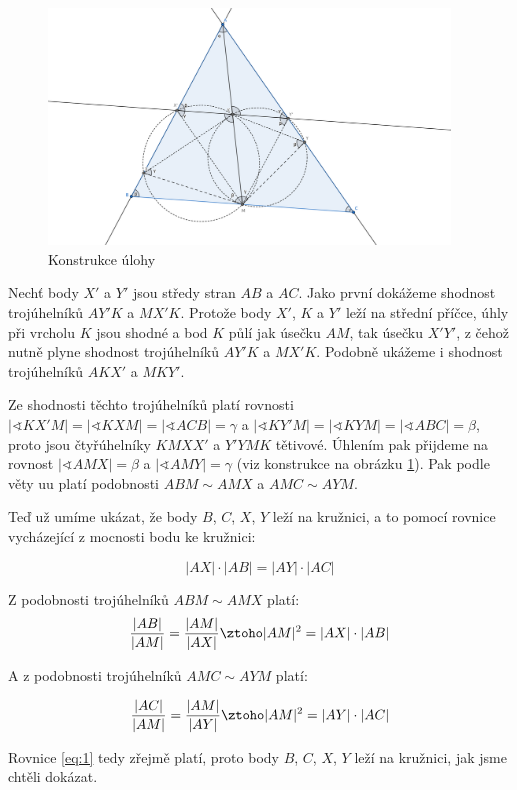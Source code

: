 \documentclass{fkssolpub}
\author{Ondřej Sedláček}
\renewcommand{\angle}{\sphericalangle}
\begin{document}
\begin{figure}
  \begin{center}
    \includegraphics[width=0.95\textwidth]{G-fig.png}
  \end{center}
  \caption{Konstrukce úlohy}
  \label{fig:1}
\end{figure}


Nechť body $X'$ a $Y'$ jsou středy stran $AB$ a $AC$. Jako první dokážeme shodnost trojúhelníků $AY'K$ a $MX'K$. Protože body $X'$, $K$ a $Y'$ leží na střední příčce, úhly při vrcholu $K$ jsou shodné a bod $K$ půlí jak úsečku $AM$, tak úsečku $X'Y'$, z čehož nutně plyne shodnost trojúhelníků $AY'K$ a $MX'K$. Podobně ukážeme i shodnost trojúhelníků $AKX'$ a $MKY'$.

Ze shodnosti těchto trojúhelníků platí rovnosti $|\angle KX'M| = |\angle KXM| = |\angle ACB| = \gamma$ a $|\angle KY'M| = |\angle KYM| = |\angle ABC| = \beta$, proto jsou čtyřúhelníky $KMXX'$ a $Y'YMK$ tětivové. Úhlením pak přijdeme na rovnost $|\angle AMX| = \beta$ a $|\angle AMY| = \gamma$ (viz konstrukce na obrázku \ref{fig:1}). Pak podle věty uu platí podobnosti $ABM \sim AMX$ a $AMC \sim AYM$.

Teď už umíme ukázat, že body $B$, $C$, $X$, $Y$ leží na kružnici, a to pomocí rovnice vycházející z mocnosti bodu ke kružnici:

\begin{equation} \label{eq:1}
  |AX| \cdot |AB| = |AY| \cdot |AC|
\end{equation}

Z podobnosti trojúhelníků $ABM \sim AMX$ platí:
\[
  \frac{|AB|}{|AM|} = \frac{|AM|}{|AX|} \ztoho |AM|^2 = |AX| \cdot |AB|
\]

A z podobnosti trojúhelníků $AMC \sim AYM$ platí:

\[
  \frac{|AC|}{|AM|} = \frac{|AM|}{|AY|} \ztoho |AM|^2 = |AY| \cdot |AC|
\]

Rovnice \ref{eq:1} tedy zřejmě platí, proto body $B$, $C$, $X$, $Y$ leží na kružnici, jak jsme chtěli dokázat.
\end{document}
